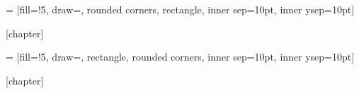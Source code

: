 
 = [fill=!5,
draw=,
rounded corners,
rectangle, inner sep=10pt, inner ysep=10pt]

\newcommand{\retenir}[2][]
{%
	\setlength{\netlength}{\textwidth}
	\addtolength{\netlength}{-20pt}
	
	\bigskip\noindent
	\begin{tikzpicture}
	\node[dboxstyle] (dbox)
	{\begin{minipage}{\netlength}
		\ifthenelse{\equal{#1}{\empty}}{\smallskip}{\medskip}
		#2
		\end{minipage}
	};
	\node[inner ysep=0pt] at (dbox.north west) [anchor=west, xshift=2mm,  fill=white, text=\defcolorfill, top color=white, bottom color=\defcolorfill!5, rounded corners]
	{\textbf{\large A retenir !}
		\ifthenelse{\equal{#1}{\empty}}{}{{\large(#1)}}
	};
	\end{tikzpicture}
}


[chapter]

 = [fill=\thmcolorfill!5,
                         draw=\thmcolorborder,
    rectangle, rounded corners, inner sep=10pt, inner ysep=10pt]

\newcommand{\thm}[2][]
{\stepcounter{thmcounter}
 \setlength{\netlength}{\textwidth}
 \addtolength{\netlength}{-20pt}
 
 \medskip\noindent
 \begin{tikzpicture}
   \node[tboxstyle] (dbox)
   {\begin{minipage}{\netlength}
    \ifthenelse{\equal{#1}{\empty}}{\smallskip}{\medskip}
    #2
    \end{minipage}
    };
   \node at (dbox.north west) [xshift=2mm, anchor=west, fill=white, text=\thmcolorborder, top color=white, bottom color=\thmcolorfill!5, rounded corners]
   {\textbf{\large Théorème \arabic{thmcounter}}
    \ifthenelse{\equal{#1}{\empty}}{}{{\large(#1)}}
    };
 \end{tikzpicture}
 }



[chapter]

